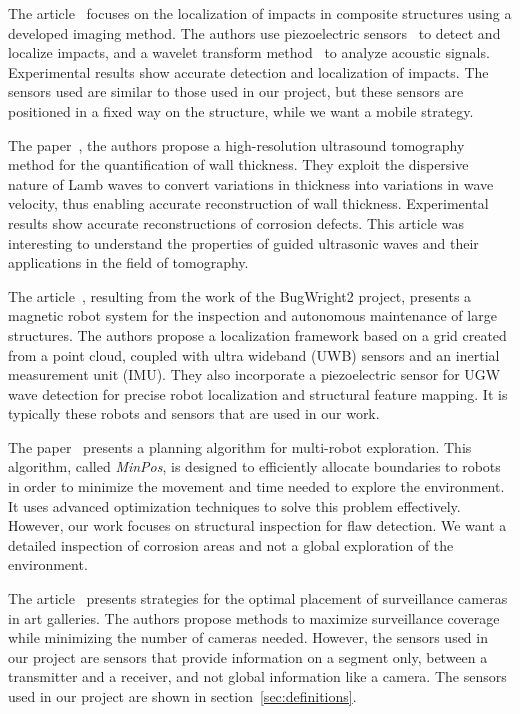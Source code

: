 The article~\cite{inventions3030059} focuses on the localization of impacts in composite structures using a developed imaging method.
The authors use piezoelectric sensors~\cite{enwiki:1154129092} to detect and localize impacts, and a wavelet transform method~\cite{enwiki:1147185762} to analyze acoustic signals.
Experimental results show accurate detection and localization of impacts.
The sensors used are similar to those used in our project, but these sensors are positioned in a fixed way on the structure, while we want a mobile strategy.

The paper~\cite{HUTHWAITE2013979}, the authors propose a high-resolution ultrasound tomography method for the quantification of wall thickness.
They exploit the dispersive nature of Lamb waves to convert variations in thickness into variations in wave velocity, thus enabling accurate reconstruction of wall thickness.
Experimental results show accurate reconstructions of corrosion defects.
This article was interesting to understand the properties of guided ultrasonic waves and their applications in the field of tomography.

The article~\cite{s22093235}, resulting from the work of the BugWright2 project, presents a magnetic robot system for the inspection and autonomous maintenance of large structures.
The authors propose a localization framework based on a grid created from a point cloud, coupled with ultra wideband (UWB) sensors and an inertial measurement unit (IMU).
They also incorporate a piezoelectric sensor for UGW wave detection for precise robot localization and structural feature mapping.
It is typically these robots and sensors that are used in our work.

The paper~\cite{bautin:hal-00757960} presents a planning algorithm for multi-robot exploration.
This algorithm, called \textit{MinPos}, is designed to efficiently allocate boundaries to robots in order to minimize the movement and time needed to explore the environment. It uses advanced optimization techniques to solve this problem effectively.
However, our work focuses on structural inspection for flaw detection.
We want a detailed inspection of corrosion areas and not a global exploration of the environment.

The article~\cite{article455556} presents strategies for the optimal placement of surveillance cameras in art galleries.
The authors propose methods to maximize surveillance coverage while minimizing the number of cameras needed.
However, the sensors used in our project are sensors that provide information on a segment only, between a transmitter and a receiver, and not global information like a camera.
The sensors used in our project are shown in section~\ref{sec:definitions}.

